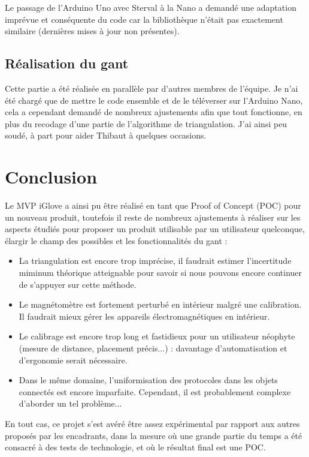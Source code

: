 \documentclass[10pt]{article}
\begin{document}
            Le passage de l'Arduino Uno avec Sterval à la Nano a demandé une adaptation imprévue et conséquente du code car la bibliothèque n'était pas exactement similaire
                (dernières mises à jour non présentes).
            
            
        \subsection{Réalisation du gant}
            Cette partie a été réalisée en parallèle par d'autres membres de l'équipe. 
            Je n'ai été chargé que de mettre le code ensemble et de le téléverser sur l'Arduino Nano, cela a cependant demandé
                de nombreux ajustements afin que tout fonctionne, en plus du recodage d'une partie de l'algorithme de triangulation.
            J'ai ainsi peu soudé, à part pour aider Thibaut à quelques occasions.

    \section{Conclusion}

            Le MVP iGlove a ainsi pu être réalisé en tant que Proof of Concept (POC) pour un nouveau produit,
             toutefois il reste de nombreux ajustements à réaliser sur les aspects étudiés pour 
             proposer un produit utilisable par un utilisateur quelconque,
             élargir le champ des possibles et les fonctionnalités du gant :
             \begin{itemize}
                \item La triangulation est encore trop imprécise, il faudrait estimer l'incertitude miminum théorique atteignable 
                        pour savoir si nous pouvons encore continuer de s'appuyer sur cette méthode.
                \item Le magnétomètre est fortement perturbé en intérieur malgré une calibration.
                        Il faudrait mieux gérer les appareils électromagnétiques en intérieur.
                \item Le calibrage est encore trop long et fastidieux pour un utilisateur néophyte (mesure de distance, placement précis...) :
                        davantage d'automatisation et d'ergonomie serait nécessaire.
                \item Dans le même domaine, l'uniformisation des protocoles dans les objets connectés est encore imparfaite. Cependant,
                        il est probablement complexe d'aborder un tel problème...
             \end{itemize}
             En tout cas,
             ce projet s'est avéré être assez expérimental par rapport aux autres proposés par les encadrants,
             dans la mesure où une grande partie du temps a été consacré à des tests de technologie,
             et où le résultat final est une POC.
\end{document}
